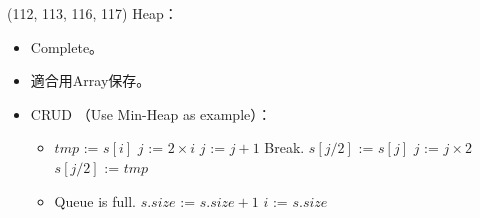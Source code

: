 \item \begin{theorem}{(112, 113, 116, 117)} Heap： \label{heap}\begin{itemize}
        \item Complete。
        \item 適合用Array保存。
        \item CRUD （Use Min-Heap as example）：\begin{itemize}
            \item \begin{algorithm}[H]
                \begin{algorithmic}[1]
                         
                            \State $tmp$ := $s[i]$
                            \State $j$ := $2 \times i$ 
                             
                                 
                                     
                                        \State $j$ := $j + 1$
                                    \EndIf
                                \EndIf
                                    \State Break.
                                \Else {}
                                    \State $s[j / 2]$ := $s[j]$
                                    \State $j$ := $j \times 2$
                                \EndIf
                            \EndWhile
                            \State $s[j / 2]$ := $tmp$
                        \EndFor
                    \EndFunction
                \end{algorithmic}
            \end{algorithm} 
            \item \begin{algorithm}[H]
                \begin{algorithmic}[1]
                            \State Queue is full.
                            \State \Return 
                        \EndIf
                        \State $s.size$ := $s.size + 1$
                        \State $i$ := $s.size$ 
                         

\end{algorithmic}
\end{algorithm}
\end{itemize}
\end{itemize}
\end{theorem}
